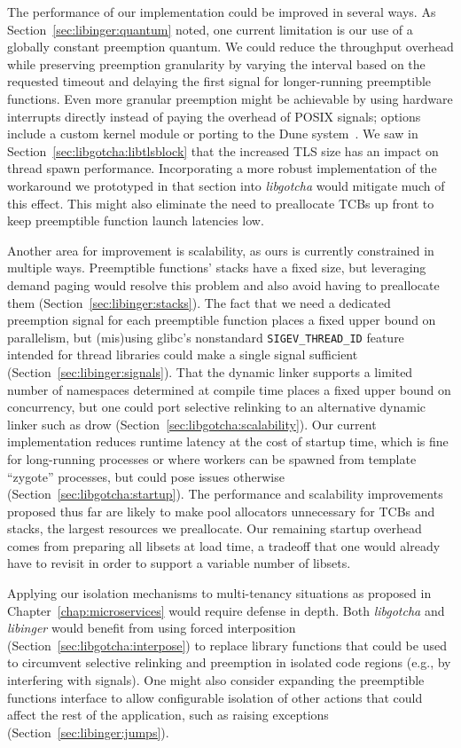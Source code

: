 The performance of our implementation could be improved in several ways.  As
Section~\ref{sec:libinger:quantum} noted, one current limitation is our use of a
globally constant preemption quantum.  We could reduce the throughput overhead while
preserving preemption granularity by varying the interval based on the requested
timeout and delaying the first signal for longer-running preemptible functions.  Even
more granular preemption might be achievable by using hardware interrupts directly
instead of paying the overhead of POSIX signals; options include a custom kernel
module or porting to the Dune system~\cite{Belay:osdi2012}.  We saw in
Section~\ref{sec:libgotcha:libtlsblock} that the increased TLS size has an impact on
thread spawn performance.  Incorporating a more robust implementation of the
workaround we prototyped in that section into \textit{libgotcha} would mitigate much
of this effect.  This might also eliminate the need to preallocate TCBs up front to
keep preemptible function launch latencies low.

Another area for improvement is scalability, as ours is currently constrained in
multiple ways.  Preemptible functions' stacks have a fixed size, but leveraging
demand paging would resolve this problem and also avoid having to preallocate them
(Section~\ref{sec:libinger:stacks}).  The fact that we need a dedicated preemption
signal for each preemptible function places a fixed upper bound on parallelism, but
(mis)using glibc's nonstandard \texttt{SIGEV\_THREAD\_ID} feature intended for thread
libraries could make a single signal sufficient (Section~\ref{sec:libinger:signals}).
That the dynamic linker supports a limited number of namespaces determined at compile
time places a fixed upper bound on concurrency, but one could port selective
relinking to an alternative dynamic linker such as drow
(Section~\ref{sec:libgotcha:scalability}).  Our current implementation reduces
runtime latency at the cost of startup time, which is fine for long-running processes
or where workers can be spawned from template ``zygote'' processes, but could pose
issues otherwise (Section~\ref{sec:libgotcha:startup}).  The performance and
scalability improvements proposed thus far are
likely to make pool allocators unnecessary for TCBs and stacks, the largest resources
we preallocate.  Our remaining startup overhead comes from preparing all libsets at
load time, a tradeoff that one would already have to revisit in order to support a
variable number of libsets.

Applying our isolation mechanisms to multi-tenancy situations as proposed in
Chapter~\ref{chap:microservices} would require defense in depth.  Both
\textit{libgotcha} and \textit{libinger} would benefit from using forced
interposition (Section~\ref{sec:libgotcha:interpose}) to replace library functions
that could be used to circumvent selective relinking and preemption in isolated code
regions (e.g., by interfering with signals).  One might also consider expanding the
preemptible functions interface to allow configurable isolation of other actions that
could affect the rest of the application, such as raising exceptions
(Section~\ref{sec:libinger:jumps}).

